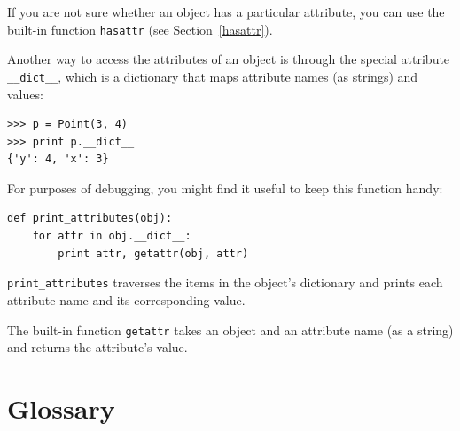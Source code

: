 \documentclass[10pt]{book}
\begin{document}

If you are not sure whether an object has a particular attribute, you
can use the built-in function {\tt hasattr} (see Section~\ref{hasattr}).


Another way to access the attributes of an object is through the
special attribute \verb"__dict__", which is a dictionary that maps
attribute names (as strings) and values:

\beforeverb
\begin{verbatim}
>>> p = Point(3, 4)
>>> print p.__dict__
{'y': 4, 'x': 3}
\end{verbatim}
\afterverb
%
For purposes of debugging, you might find it useful to keep this
function handy:

\beforeverb
\begin{verbatim}
def print_attributes(obj):
    for attr in obj.__dict__:
        print attr, getattr(obj, attr)
\end{verbatim}
\afterverb
%
\verb"print_attributes" traverses the items in the object's dictionary
and prints each attribute name and its corresponding value.


The built-in function {\tt getattr} takes an object and an attribute
name (as a string) and returns the attribute's value.



\section{Glossary}
\end{document}

